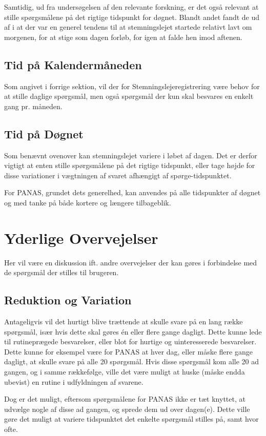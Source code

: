 Samtidig, ud fra undersøgelsen af den relevante forskning, er det også relevant at stille spørgsmålene på det rigtige tidspunkt for døgnet.
Blandt andet fandt de ud af i \citet{PANAS} at der var en generel tendens til at stemningslejet startede relativt lavt om morgenen, for at stige som dagen forløb, for igen at falde hen imod aftenen.

\subsection{Tid på Kalendermåneden}
Som angivet i forrige sektion, vil der for Stemningslejeregistrering være behov for at stille daglige spørgsmål, men også spørgsmål der kun skal besvares en enkelt gang pr. måneden.

\subsection{Tid på Døgnet}
Som benævnt ovenover kan stemningslejet variere i løbet af dagen.
Det er derfor vigtigt at enten stille spørgsmålene på det rigtige tidspunkt, eller tage højde for disse variationer i vægtningen af svaret afhængigt af spørge-tidspunktet.

For PANAS, grundet dets generelhed, kan anvendes på alle tidspunkter af døgnet og med tanke på både kortere og længere tilbageblik.

\section{Yderlige Overvejelser}
Her vil være en diskussion ift. andre overvejelser der kan gøres i forbindelse med de spørgsmål der stilles til brugeren.

\subsection{Reduktion og Variation}
Antageligvis vil det hurtigt blive trættende at skulle svare på en lang række spørgsmål, især hvis dette skal gøres én eller flere gange dagligt.
Dette kunne lede til rutineprægede besvarelser, eller blot for hurtige og uinteresserede besvarelser.
Dette kunne for eksempel være for PANAS at hver dag, eller måske flere gange dagligt, at skulle svare på alle 20 spørgsmål.
Hvis disse spørgsmål kom alle 20 ad gangen, og i samme rækkefølge, ville det være muligt at huske (måske endda ubevist) en rutine i udfyldningen af svarene.

Dog er det muligt, eftersom spørgsmålene for PANAS ikke er tæt knyttet, at udvælge nogle af disse ad gangen, og sprede dem ud over dagen(e).
Dette ville gøre det muligt at variere tidspunktet det enkelte spørgsmål stilles på, samt hvor ofte.

